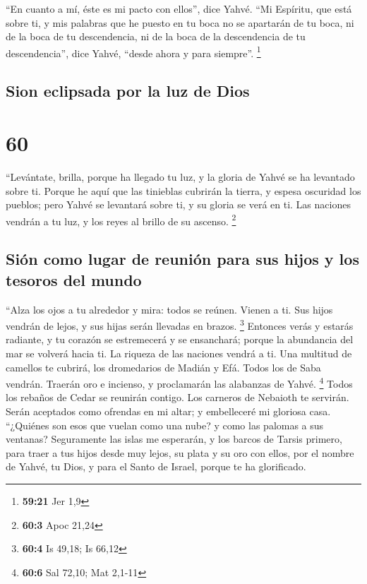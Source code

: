  ``En cuanto a mí, éste es mi pacto con ellos'', dice
Yahvé. ``Mi Espíritu, que está sobre ti, y mis palabras que he puesto en
tu boca no se apartarán de tu boca, ni de la boca de tu descendencia, ni
de la boca de la descendencia de tu descendencia'', dice Yahvé, ``desde
ahora y para siempre''. \footnote{\textbf{59:21} Jer 1,9}

\hypertarget{sion-eclipsada-por-la-luz-de-dios}{%
\subsection{Sion eclipsada por la luz de
Dios}\label{sion-eclipsada-por-la-luz-de-dios}}

\hypertarget{section-59}{%
\section{60}\label{section-59}}

 ``Levántate, brilla, porque ha llegado tu luz, y la
gloria de Yahvé se ha levantado sobre ti.  Porque he aquí
que las tinieblas cubrirán la tierra, y espesa oscuridad los pueblos;
pero Yahvé se levantará sobre ti, y su gloria se verá en ti.
 Las naciones vendrán a tu luz, y los reyes al brillo de
su ascenso. \footnote{\textbf{60:3} Apoc 21,24}

\hypertarget{siuxf3n-como-lugar-de-reuniuxf3n-para-sus-hijos-y-los-tesoros-del-mundo}{%
\subsection{Sión como lugar de reunión para sus hijos y los tesoros del
mundo}\label{siuxf3n-como-lugar-de-reuniuxf3n-para-sus-hijos-y-los-tesoros-del-mundo}}

 ``Alza los ojos a tu alrededor y mira: todos se reúnen.
Vienen a ti. Sus hijos vendrán de lejos, y sus hijas serán llevadas en
brazos. \footnote{\textbf{60:4} Is 49,18; Is 66,12} 
Entonces verás y estarás radiante, y tu corazón se estremecerá y se
ensanchará; porque la abundancia del mar se volverá hacia ti. La riqueza
de las naciones vendrá a ti.  Una multitud de camellos te
cubrirá, los dromedarios de Madián y Efá. Todos los de Saba vendrán.
Traerán oro e incienso, y proclamarán las alabanzas de Yahvé.
\footnote{\textbf{60:6} Sal 72,10; Mat 2,1-11}  Todos los
rebaños de Cedar se reunirán contigo. Los carneros de Nebaioth te
servirán. Serán aceptados como ofrendas en mi altar; y embelleceré mi
gloriosa casa.  ``¿Quiénes son esos que vuelan como una
nube? y como las palomas a sus ventanas?  Seguramente las
islas me esperarán, y los barcos de Tarsis primero, para traer a tus
hijos desde muy lejos, su plata y su oro con ellos, por el nombre de
Yahvé, tu Dios, y para el Santo de Israel, porque te ha glorificado.

